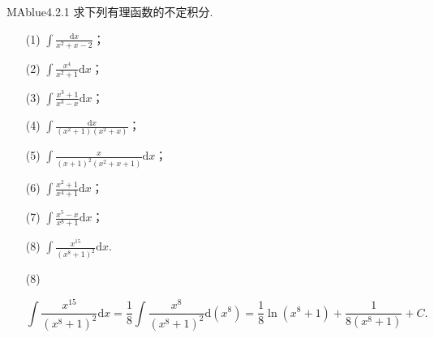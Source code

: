 \begin{problem}{MAblue}{4.2.1}
    求下列有理函数的不定积分.
    \begin{multicols}{2}
        \begin{enumerate}
            \item[(1)]
            $\displaystyle \int \frac{\mathrm dx}{x^2 + x - 2}$；
            \item[(2)]
            $\displaystyle \int \frac{x^4}{x^2 + 1} \mathrm dx$；
            \item[(3)]
            $\displaystyle \int \frac{x^3 + 1}{x^3 - x} \mathrm dx$；
            \item[(4)]
            $\displaystyle \int \frac{\mathrm dx}{(x^2+1)(x^2+x)}$；
            \item[(5)]
            $\displaystyle \int \frac x {(x+1)^2(x^2+x+1)} \mathrm dx$；
            \item[(6)]
            $\displaystyle \int \frac{x^2+1}{x^4+1} \mathrm dx$；
            \item[(7)]
            $\displaystyle \int \frac{x^5-x}{x^8+1} \mathrm dx$；
            \item[(8)]
            $\displaystyle \int \frac{x^{15}}{(x^8+1)^2} \mathrm dx$.
        \end{enumerate}
    \end{multicols}
\end{problem}

\begin{enumerate}
    \item[(8)]
    \begin{solution}
        \[
            \int \frac{x^{15}}{(x^8+1)^2} \mathrm dx = \frac 1 8 \int \frac{x^8}{(x^8+1)^2} \mathrm d(x^8) = \frac 1 8 \ln(x^8+1) + \frac 1 {8(x^8+1)} + C.
        \]
    \end{solution}
\end{enumerate}